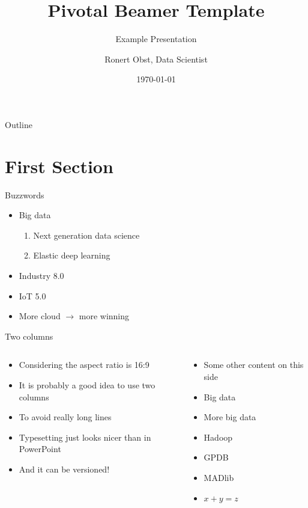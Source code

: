 \documentclass[english,presentation]{pivotalbeamer}
\subtitle{Example Presentation}
\author{Ronert Obst, Data Scientist}
\date{\today}
\title{Pivotal Beamer Template}
\begin{document}
\maketitle
\begin{frame}{Outline}
\tableofcontents
\end{frame}

\section{First Section}
\label{sec-1}
\begin{frame}[fragile,label=sec-1-1]{Buzzwords}
\begin{itemize}
\item Big data
\begin{enumerate}
\item Next generation data science
\item Elastic deep learning
\end{enumerate}
\item Industry 8.0
\item IoT 5.0
\item More cloud $\rightarrow$ more winning
\end{itemize}
\end{frame}

\begin{frame}[fragile,label=sec-1-2]{Two columns}
\begin{columns}
\begin{column}{0.5\textwidth}
\begin{itemize}
\item Considering the aspect ratio is 16:9
\item It is probably a good idea to use two columns
\item To avoid really long lines
\item Typesetting just looks nicer than in PowerPoint
\item And it can be versioned!
\end{itemize}
\end{column}

\begin{column}{0.5\textwidth}
\begin{itemize}
\item Some other content on this side
\item Big data
\item More big data
\item Hadoop
\item GPDB
\item MADlib
\item $x+y = z$
\end{itemize}
\end{column}
\end{columns}
\end{frame}
\end{document}
